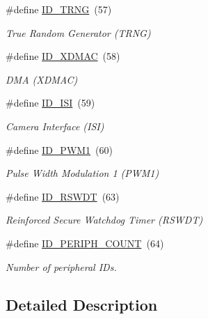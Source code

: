 \begin{DoxyCompactItemize}
\#define \mbox{\hyperlink{group__SAME70J19__id_ga32e3a2d1d01b609629bf9a7637376ead}{I\+D\+\_\+\+T\+R\+NG}}~(57)
\begin{DoxyCompactList}\small\item\em True Random Generator (T\+R\+NG) \end{DoxyCompactList}\item 
\mbox{\label{group__SAME70J19__id_gafcf327f1ac9eb298ceb416463e291ed2}} 
\#define \mbox{\hyperlink{group__SAME70J19__id_gafcf327f1ac9eb298ceb416463e291ed2}{I\+D\+\_\+\+X\+D\+M\+AC}}~(58)
\begin{DoxyCompactList}\small\item\em D\+MA (X\+D\+M\+AC) \end{DoxyCompactList}\item 
\mbox{\label{group__SAME70J19__id_gaa7f6addc734fceb5dc89879f076c92ce}} 
\#define \mbox{\hyperlink{group__SAME70J19__id_gaa7f6addc734fceb5dc89879f076c92ce}{I\+D\+\_\+\+I\+SI}}~(59)
\begin{DoxyCompactList}\small\item\em Camera Interface (I\+SI) \end{DoxyCompactList}\item 
\mbox{\label{group__SAME70J19__id_ga84497f839e8dccbfdc85bf61aea96130}} 
\#define \mbox{\hyperlink{group__SAME70J19__id_ga84497f839e8dccbfdc85bf61aea96130}{I\+D\+\_\+\+P\+W\+M1}}~(60)
\begin{DoxyCompactList}\small\item\em Pulse Width Modulation 1 (P\+W\+M1) \end{DoxyCompactList}\item 
\mbox{\label{group__SAME70J19__id_ga0315bd21be83b0140076967163c5e565}} 
\#define \mbox{\hyperlink{group__SAME70J19__id_ga0315bd21be83b0140076967163c5e565}{I\+D\+\_\+\+R\+S\+W\+DT}}~(63)
\begin{DoxyCompactList}\small\item\em Reinforced Secure Watchdog Timer (R\+S\+W\+DT) \end{DoxyCompactList}\item 
\mbox{\label{group__SAME70J19__id_gad0762589e782b5eca161d9d344306da7}} 
\#define \mbox{\hyperlink{group__SAME70J19__id_gad0762589e782b5eca161d9d344306da7}{I\+D\+\_\+\+P\+E\+R\+I\+P\+H\+\_\+\+C\+O\+U\+NT}}~(64)
\begin{DoxyCompactList}\small\item\em Number of peripheral I\+Ds. \end{DoxyCompactList}\end{DoxyCompactItemize}


\subsection{Detailed Description}
